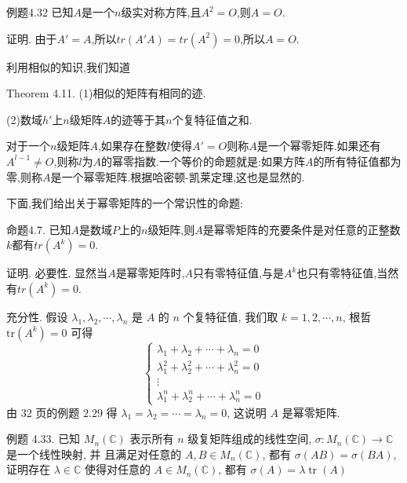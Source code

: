 \documentclass{article}
\begin{document}
\vspace{1ex}
{\heiti 例题4.32} {\kaishu 已知$A$是一个$n$级实对称方阵,且$A^2 = O$,则$A = O$.}

{\heiti 证明.} 由于$A' = A$,所以$tr \left(A'A\right) = tr \left(A^2\right) = 0$,所以$A = O$.

利用相似的知识,我们知道

{\heiti Theorem 4.11.} (1)相似的矩阵有相同的迹.

(2)数域$h'$上$n$级矩阵$A$的迹等于其$n$个复特征值之和.

\vspace{1ex}
对于一个$n$级矩阵$A$,如果存在整数$l$使得$A' = O$则称$A$是一个幂零矩阵.如果还有$A^{l - 1} \neq O$,则称$l$为$A$的幂零指数.一个等价的命题就是:如果方阵$A$的所有特征值都为零,则称$A$是一个幂零矩阵.根据哈密顿-凯莱定理,这也是显然的.

下面,我们给出关于幂零矩阵的一个常识性的命题:

\vspace{1ex}
{\heiti 命题4.7.} {\kaishu 已知$A$是数域$P$上的$n$级矩阵,则$A$是幂零矩阵的充要条件是对任意的正整数$k$都有$tr \left(A^k\right) = 0$.}

{\heiti 证明.} 必要性. 显然当$A$是幂零矩阵时,$A$只有零特征值,与是$A^k$也只有零特征值,当然有$tr \left(A^k\right) = 0$.

充分性. 假设 $\lambda_{1}, \lambda_{2}, \cdots, \lambda_{n}$ 是 $A$ 的 $n$ 个复特征值, 我们取 $k=1,2, \cdots, n$, 根哲 $\mathrm{tr}\left(A^k\right) = 0$ 可得
\begin{equation*}
    \left\{\begin{array}{c}
        \lambda_{1}+\lambda_{2}+\cdots+\lambda_{n}=0             \\
        \lambda_{1}^{2}+\lambda_{2}^{2}+\cdots+\lambda_{n}^{2}=0 \\
        \vdots                                                   \\
        \lambda_{1}^{n}+\lambda_{2}^{n}+\cdots+\lambda_{n}^{n}=0
    \end{array}\right.
\end{equation*}
由 32 页的例题 $2.29$ 得 $\lambda_{1}=\lambda_{2}=\cdots=\lambda_{n}=0$, 这说明 $A$ 是幂零矩阵.

\vspace{1ex}
{\heiti 例题 4.33.} {\kaishu 已知 $M_{n}(\mathbb{C})$ 表示所有 $n$ 级复矩阵组成的线性空间, $\sigma: M_{n}(\mathbb{C}) \longrightarrow \mathbb{C}$ 是一个线性映射, 并 且满足对任意的 $A, B \in M_{n}(\mathbb{C})$, 都有 $\sigma(A B)=\sigma(B A)$, 证明存在 $\lambda \in \mathbb{C}$ 使得对任意的 $A \in M_{n}(\mathbb{C})$, 都有
    $\sigma(A)=\lambda \operatorname{tr}(A)$}
\end{document}
